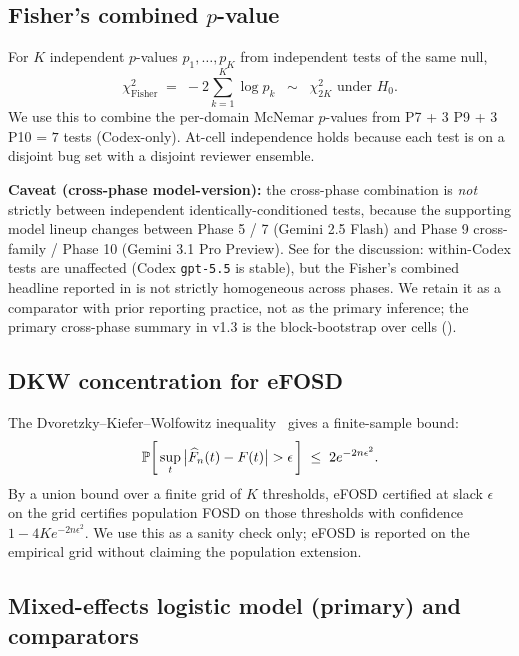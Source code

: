 \subsection{Fisher's combined $p$-value~\cite{fisher1925statistical}}

For $K$ independent $p$-values $p_1, \ldots, p_K$ from independent tests of the same null,
\begin{equation}
  \chi^2_{\mathrm{Fisher}} \;=\; -2 \sum_{k=1}^{K} \log p_k \;\;\sim\;\; \chi^2_{2K} \text{ under } H_0.
  \label{eq:fisher-combined}
\end{equation}
We use this to combine the per-domain McNemar $p$-values from P7 + 3 P9 + 3 P10 = $7$ tests (Codex-only). At-cell independence holds because each test is on a disjoint bug set with a disjoint reviewer ensemble.

\textbf{Caveat (cross-phase model-version):} the cross-phase combination is \emph{not} strictly between independent identically-conditioned tests, because the supporting model lineup changes between Phase 5 / 7 (Gemini 2.5 Flash) and Phase 9 cross-family / Phase 10 (Gemini 3.1 Pro Preview). See  for the discussion: within-Codex tests are unaffected (Codex \texttt{gpt-5.5} is stable), but the Fisher's combined headline reported in  is not strictly homogeneous across phases. We retain it as a comparator with prior reporting practice, not as the primary inference; the primary cross-phase summary in v1.3 is the block-bootstrap over cells ().

\subsection{DKW concentration for eFOSD}

The Dvoretzky--Kiefer--Wolfowitz inequality~\cite{dvoretzky1956asymptotic} gives a finite-sample bound:
\begin{equation}
  \mathbb{P}\!\left[\, \sup_t \big|\widehat{F}_n(t) - F(t)\big| > \epsilon\, \right] \;\le\; 2 e^{-2 n \epsilon^2}.
  \label{eq:dkw}
\end{equation}
By a union bound over a finite grid of $K$ thresholds, eFOSD certified at slack $\epsilon$ on the grid certifies population FOSD on those thresholds with confidence $1 - 4 K e^{-2 n \epsilon^2}$. We use this as a sanity check only; eFOSD is reported on the empirical grid without claiming the population extension.

\subsection{Mixed-effects logistic model (primary) and comparators}
\label{sec:mixed-effects}

